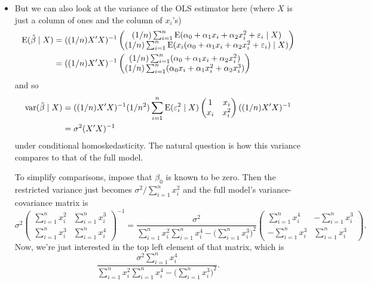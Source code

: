 \begin{itemize}[leftmargin=0pt]
\item But we can also look at the variance of the OLS estimator here
  (where $X$ is just a column of ones and the column of $x_i$'s)
  \begin{align*}
    \operatorname{E}(\hat{\beta} \mid X)
    &= ((1/n) X'X)^{-1}
    \begin{pmatrix}
      (1/n) \sum_{i=1}^n \operatorname{E}(\alpha_0 + \alpha_1 x_i + \alpha_2 x_i^2 + \varepsilon_i \mid X) \\
      (1/n) \sum_{i=1}^n \operatorname{E}(x_i (\alpha_0 + \alpha_1 x_i + \alpha_2 x_i^2 + \varepsilon_i) \mid X)
    \end{pmatrix} \\
    &= ((1/n) X'X)^{-1}
    \begin{pmatrix}
      (1/n) \sum_{i=1}^n (\alpha_0 + \alpha_1 x_i + \alpha_2 x_i^2) \\
      (1/n) \sum_{i=1}^n (\alpha_0 x_i + \alpha_1 x_i^2 + \alpha_2 x_i^3)
    \end{pmatrix}
  \end{align*}
  and so
  \begin{align*}
    \operatorname{var}(\hat{\beta} \mid X)
    &= ((1/n) X'X)^{-1}
      (1/n^2) \sum_{i=1}^n \operatorname{E}(\varepsilon_i^2 \mid X)
      \begin{pmatrix} 1 & x_i \\ x_i & x_i^2 \end{pmatrix}
      ((1/n) X'X)^{-1} \\
    &= \sigma^2 (X'X)^{-1}
  \end{align*}
  under conditional homoskedasticity.  The natural question is how
  this variance compares to that of the full model.

  To simplify comparisons, impose that $\beta_0$ is known to be zero.  Then
  the restricted variance just becomes $\sigma^2 / \sum_{i=1}^n x_i^2$ and the full
  model's variance-covariance matrix is
  \begin{equation*} \sigma^2
    \begin{pmatrix}
      \sum_{i=1}^n x_i^2 & \sum_{i=1}^n x_i^3 \\
      \sum_{i=1}^n x_i^3 & \sum_{i=1}^n x_i^4
    \end{pmatrix}^{-1}
    = \frac{\sigma^2}{\sum_{i=1}^n x_i^2 \sum_{i=1}^n x_i^4 - \big( \sum_{i=1}^n x_i^3 \big)^2}
    \begin{pmatrix}
      \sum_{i=1}^n x_i^4 & -\sum_{i=1}^n x_i^3 \\
      -\sum_{i=1}^n x_i^3 & \sum_{i=1}^n x_i^3
    \end{pmatrix}.
  \end{equation*}
  Now, we're just interested in the top left element of that matrix,
  which is
  \begin{equation*}
    \frac{\sigma^2 \sum_{i=1}^n x_i^4}%
    {\sum_{i=1}^n x_i^2 \sum_{i=1}^n x_i^4 - \big( \sum_{i=1}^n x_i^3 \big)^2}.
  \end{equation*}


\end{itemize}
